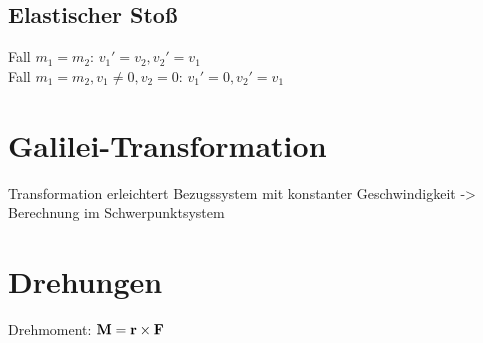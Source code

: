 \documentclass[fs, footer]{latex4ei}
\begin{document}
\begin{multicols*}{4}
\subsection{Elastischer Stoß}
Fall $m_1 = m_2$: $v_1' = v_2, v_2' = v_1$\\
Fall $m_1 = m_2, v_1 \neq 0, v_2 = 0$: $v_1' = 0, v_2' = v_1$\\

\section{Galilei-Transformation}
Transformation erleichtert Bezugssystem mit konstanter Geschwindigkeit
-> Berechnung im Schwerpunktsystem

\section{Drehungen}
Drehmoment: $\textbf{M} = \textbf{r} \times \textbf{F}$\\




	
\end{multicols*}
\end{document}
